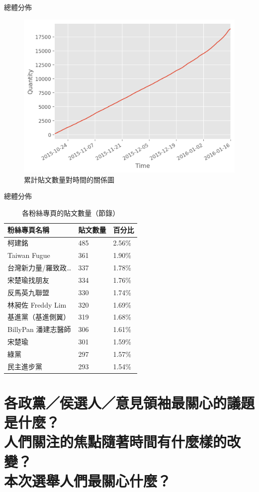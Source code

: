 \documentclass{beamer}
\begin{document}
\begin{CJK}{UTF8}{bkai}
\begin{frame}{總體分佈}
\begin{figure}
  \includegraphics[width=.7\textwidth, height=.7\textheight, keepaspectratio]{quantity_time_cumulative_graph}
  \caption{累計貼文數量對時間的關係圖}
\end{figure}
\end{frame}

\begin{frame}{總體分佈}
\begin{table}
\caption{各粉絲專頁的貼文數量（節錄）}
\begin{tabular}{@{}L{10em}C{4em}C{4em}@{}}
  \toprule
  粉絲專頁名稱 & 貼文數量 & 百分比 \\
  \midrule
  柯建銘 & 485 & 2.56\% \\
  Taiwan Fugue & 361 & 1.90\% \\
  台灣新力量/羅致政\dots & 337 & 1.78\% \\
  宋楚瑜找朋友 & 334 & 1.76\% \\
  反馬英九聯盟 & 330 & 1.74\% \\
  林昶佐 Freddy Lim & 320 & 1.69\% \\
  基進黨（基進側翼） & 319 & 1.68\% \\
  BillyPan 潘建志醫師 & 306 & 1.61\% \\
  宋楚瑜 & 301 & 1.59\% \\
  綠黨 & 297 & 1.57\% \\
  民主進步黨 & 293 & 1.54\% \\
  \bottomrule
\end{tabular}
\end{table}
\end{frame}

\section{
各政黨／侯選人／意見領袖最關心的議題是什麼？\texorpdfstring{\protect\\}{}
\hspace{.35em}人們關注的焦點隨著時間有什麼樣的改變？\texorpdfstring{\protect\\}{}
\hspace{.35em}本次選舉人們最關心什麼？
}


\end{CJK}
\end{document}
